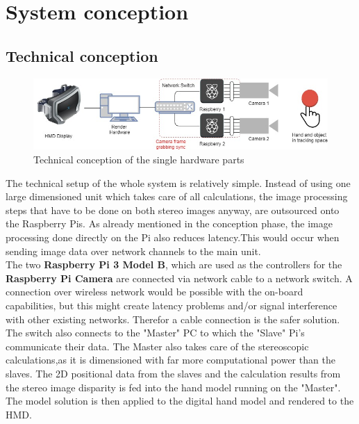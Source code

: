 \chapter{System conception}\section{Technical conception}
\begin{figure}[H]
\includegraphics[width=\textwidth]{images/technical_setup.jpg}
\caption{Technical conception of the single hardware parts}
\label{technical-copnception}
\end{figure} 
The technical setup of the whole system is relatively simple. Instead of using one large dimensioned unit which takes care of all calculations, the image processing steps that have to be done on both stereo images anyway, are outsourced onto the Raspberry Pis. 
As already mentioned in the conception phase, the image processing done directly on the Pi also reduces latency.This  would occur when sending image data over network channels to the main unit.\\
The two \textbf{Raspberry Pi 3 Model B}, which are used as the controllers for the \textbf{Raspberry Pi Camera} are connected via network cable to a network switch. A connection over wireless network would be possible with the on-board capabilities, but this might create latency problems and/or signal interference with other existing networks. Therefor a cable connection is the safer solution.
The switch also connects to the "Master" PC to which the "Slave" Pi's communicate their data. The Master also takes care of the stereoscopic calculations,as it is dimensioned with far more computational power than the slaves. The 2D positional data from the slaves and the calculation results from the stereo image disparity is fed into the hand model running on the "Master". The model solution is then applied to the digital hand model and rendered to the HMD.
